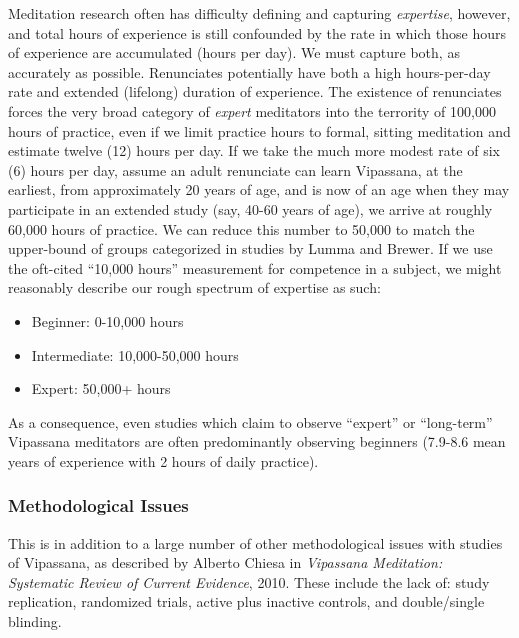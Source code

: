 \documentclass[a4paper, amsfonts, amssymb, amsmath, reprint, showkeys, nofootinbib, twoside]{revtex4-1}
\begin{document}
Meditation research often has difficulty defining and capturing \textit{expertise},
however, and total hours of experience is still confounded by the rate in which those
hours of experience are accumulated (hours per day). We must capture both, as accurately as
possible. Renunciates potentially have both a high hours-per-day rate and extended
(lifelong) duration of experience. The existence of renunciates forces the very
broad category of \textit{expert} meditators into the terrority of 100,000 hours
of practice, even if we limit practice hours to formal, sitting meditation and
estimate twelve (12) hours per day. If we take the much more modest rate of six (6)
hours per day, assume an adult renunciate can learn Vipassana, at the earliest, from
approximately 20 years of
age, and is now of an age when they may participate in an extended study (say, 40-60
years of age), we arrive at roughly 60,000 hours of practice.
We can reduce this number to 50,000 to match the upper-bound of groups
categorized in studies by Lumma and Brewer.
\cite{https://doi.org/10.1016/j.ijpsycho.2015.04.017,https://doi.org/10.1073/pnas.1112029108}
If we use the oft-cited
``10,000 hours'' measurement for competence in a subject, we might reasonably
describe our rough spectrum of expertise as such:

\begin{itemize}
	\item Beginner: 0-10,000 hours
	\item Intermediate: 10,000-50,000 hours
	\item Expert: 50,000+ hours
\end{itemize}

As a consequence, even studies which claim to observe ``expert'' or ``long-term''
Vipassana meditators are often predominantly observing beginners (7.9-8.6 mean years
of experience with 2 hours of daily practice). \cite{chiesa2010vipassana}

\subsubsection{Methodological Issues}

This is in addition to a large number of other
methodological issues with studies of Vipassana, as described by Alberto Chiesa in
\textit{Vipassana Meditation: Systematic Review of Current Evidence},
2010. \cite{chiesa2010vipassana} These include the lack of: study replication,
randomized trials, active plus inactive controls, and double/single blinding.
\end{document}
